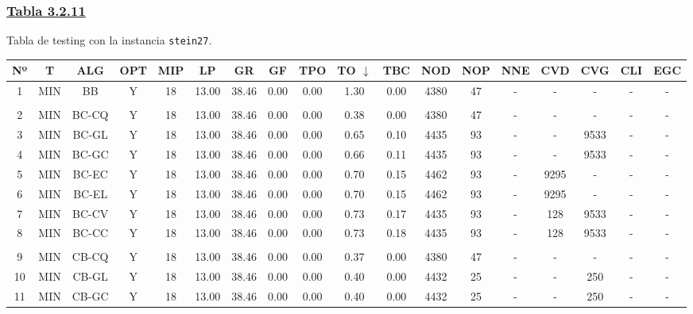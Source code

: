 \subsubsection*{\underline{Tabla 3.2.11}}
\noindent Tabla de testing con la instancia \verb_stein27_.\\

{
\footnotesize\centering
\hspace*{-5mm}\begin{tabular}{ *{17}{c|} c }
\hline
\textbf{Nº} & \textbf{T} & \textbf{ALG} & \textbf{OPT} & \textbf{MIP} & \textbf{LP} & \textbf{GR} & \textbf{GF} & \textbf{TPO} & \textbf{TO} $\downarrow$ & \textbf{TBC} & \textbf{NOD} & \textbf{NOP} & \textbf{NNE} & \textbf{CVD} & \textbf{CVG} & \textbf{CLI} & \textbf{EGC}\\
\hline
1 & MIN & BB & Y & 18 & 13.00 & 38.46 & 0.00 & 0.00 & 1.30 & 0.00 & 4380 & 47 & - & - & - & - & -\\
\hline
\multicolumn{18}{c}{}
\\
\hline
2 & MIN & BC-CQ & Y & 18 & 13.00 & 38.46 & 0.00 & 0.00 & 0.38 & 0.00 & 4380 & 47 & - & - & - & - & -\\
\hline
3 & MIN & BC-GL & Y & 18 & 13.00 & 38.46 & 0.00 & 0.00 & 0.65 & 0.10 & 4435 & 93 & - & - & 9533 & - & -\\
\hline
4 & MIN & BC-GC & Y & 18 & 13.00 & 38.46 & 0.00 & 0.00 & 0.66 & 0.11 & 4435 & 93 & - & - & 9533 & - & -\\
\hline
5 & MIN & BC-EC & Y & 18 & 13.00 & 38.46 & 0.00 & 0.00 & 0.70 & 0.15 & 4462 & 93 & - & 9295 & - & - & -\\
\hline
6 & MIN & BC-EL & Y & 18 & 13.00 & 38.46 & 0.00 & 0.00 & 0.70 & 0.15 & 4462 & 93 & - & 9295 & - & - & -\\
\hline
7 & MIN & BC-CV & Y & 18 & 13.00 & 38.46 & 0.00 & 0.00 & 0.73 & 0.17 & 4435 & 93 & - & 128 & 9533 & - & -\\
\hline
8 & MIN & BC-CC & Y & 18 & 13.00 & 38.46 & 0.00 & 0.00 & 0.73 & 0.18 & 4435 & 93 & - & 128 & 9533 & - & -\\
\hline
\multicolumn{18}{c}{}
\\
\hline
9 & MIN & CB-CQ & Y & 18 & 13.00 & 38.46 & 0.00 & 0.00 & 0.37 & 0.00 & 4380 & 47 & - & - & - & - & -\\
\hline
10 & MIN & CB-GL & Y & 18 & 13.00 & 38.46 & 0.00 & 0.00 & 0.40 & 0.00 & 4432 & 25 & - & - & 250 & - & -\\
\hline
11 & MIN & CB-GC & Y & 18 & 13.00 & 38.46 & 0.00 & 0.00 & 0.40 & 0.00 & 4432 & 25 & - & - & 250 & - & -\\

\end{tabular}}
